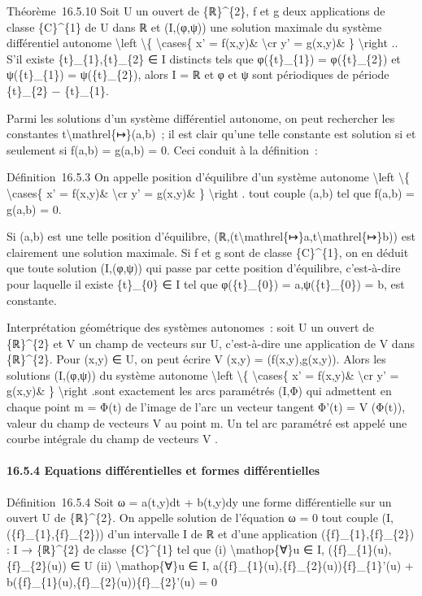 \documentclass[]{article}
\begin{document}
Théorème~16.5.10 Soit U un ouvert de \{ℝ\}\^{}\{2\}, f et g deux
applications de classe \{C\}\^{}\{1\} de U dans ℝ et (I,(φ,ψ)) une
solution maximale du système différentiel autonome \textbackslash{}left
\textbackslash{}\{ \textbackslash{}cases\{ x' = f(x,y)\&
\textbackslash{}cr y' = g(x,y)\& \} \textbackslash{}right .. S'il existe
\{t\}\_\{1\},\{t\}\_\{2\} ∈ I distincts tels que φ(\{t\}\_\{1\}) =
φ(\{t\}\_\{2\}) et ψ(\{t\}\_\{1\}) = ψ(\{t\}\_\{2\}), alors I = ℝ et φ
et ψ sont périodiques de période \{t\}\_\{2\} − \{t\}\_\{1\}.

Parmi les solutions d'un système différentiel autonome, on peut
rechercher les constantes t\textbackslash{}mathrel\{↦\}(a,b)~; il est
clair qu'une telle constante est solution si et seulement si f(a,b) =
g(a,b) = 0. Ceci conduit à la définition~:

Définition~16.5.3 On appelle position d'équilibre d'un système autonome
\textbackslash{}left \textbackslash{}\{ \textbackslash{}cases\{ x' =
f(x,y)\& \textbackslash{}cr y' = g(x,y)\& \} \textbackslash{}right .
tout couple (a,b) tel que f(a,b) = g(a,b) = 0.

Si (a,b) est une telle position d'équilibre,
(ℝ,(t\textbackslash{}mathrel\{↦\}a,t\textbackslash{}mathrel\{↦\}b)) est
clairement une solution maximale. Si f et g sont de classe
\{C\}\^{}\{1\}, on en déduit que toute solution (I,(φ,ψ)) qui passe par
cette position d'équilibre, c'est-à-dire pour laquelle il existe
\{t\}\_\{0\} ∈ I tel que φ(\{t\}\_\{0\}) = a,ψ(\{t\}\_\{0\}) = b, est
constante.

Interprétation géométrique des systèmes autonomes~: soit U un ouvert de
\{ℝ\}\^{}\{2\} et V un champ de vecteurs sur U, c'est-à-dire une
application de V dans \{ℝ\}\^{}\{2\}. Pour (x,y) ∈ U, on peut écrire V
(x,y) = (f(x,y),g(x,y)). Alors les solutions (I,(φ,ψ)) du système
autonome \textbackslash{}left \textbackslash{}\{ \textbackslash{}cases\{
x' = f(x,y)\& \textbackslash{}cr y' = g(x,y)\& \} \textbackslash{}right
.sont exactement les arcs paramétrés (I,Φ) qui admettent en chaque point
m = Φ(t) de l'image de l'arc un vecteur tangent Φ'(t) = V (Φ(t)), valeur
du champ de vecteurs V au point m. Un tel arc paramétré est appelé une
courbe intégrale du champ de vecteurs V .

\paragraph{16.5.4 Equations différentielles et formes différentielles}

Définition~16.5.4 Soit ω = a(t,y)dt + b(t,y)dy une forme différentielle
sur un ouvert U de \{ℝ\}\^{}\{2\}. On appelle solution de l'équation ω =
0 tout couple (I,(\{f\}\_\{1\},\{f\}\_\{2\})) d'un intervalle I de ℝ et
d'une application (\{f\}\_\{1\},\{f\}\_\{2\}) : I → \{ℝ\}\^{}\{2\} de
classe \{C\}\^{}\{1\} tel que (i) \textbackslash{}mathop\{∀\}u ∈ I,
(\{f\}\_\{1\}(u),\{f\}\_\{2\}(u)) ∈ U (ii) \textbackslash{}mathop\{∀\}u
∈ I, a(\{f\}\_\{1\}(u),\{f\}\_\{2\}(u))\{f\}\_\{1\}'(u) +
b(\{f\}\_\{1\}(u),\{f\}\_\{2\}(u))\{f\}\_\{2\}'(u) = 0
\end{document}
